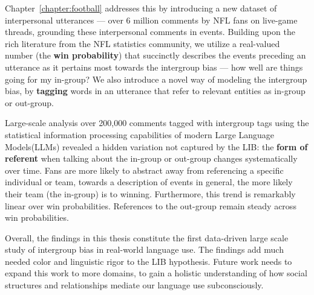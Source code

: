 Chapter~\ref{chapter:football} addresses this by introducing a new dataset of interpersonal utterances --- over 6 million comments by NFL fans on live-game threads, grounding these interpersonal comments in events. Building upon the rich literature from the NFL statistics community, we utilize a real-valued number (the \textbf{win probability}) that succinctly describes the events preceding an utterance as it pertains most towards the intergroup bias --- how well are things going for my in-group? We also introduce a novel way of modeling the intergroup bias, by \textbf{tagging} words in an utterance that refer to relevant entities as in-group or out-group. 

Large-scale analysis over 200,000 comments tagged with intergroup tags using the statistical information processing capabilities of modern Large Language Models(LLMs) revealed a hidden variation not captured by the LIB: the \textbf{form of referent} when talking about the in-group or out-group changes systematically over time. Fans are more likely to abstract away from referencing a specific individual or team, towards a description of events in general, the more likely their team (the in-group) is to winning. Furthermore, this trend is remarkably linear over win probabilities. References to the out-group remain steady across win probabilities.

Overall, the findings in this thesis constitute the first data-driven large scale study of intergroup bias in real-world language use. The findings add much needed color and linguistic rigor to the LIB hypothesis. Future work needs to expand this work to more domains, to gain a holistic understanding of how social structures and relationships mediate our language use subconsciously.
